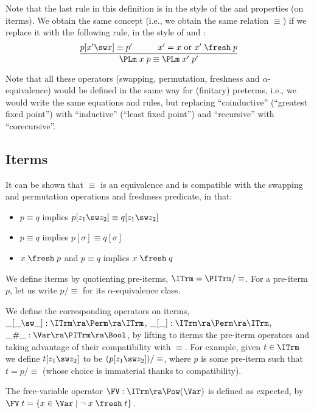Note that the last rule in this definition is in the style of the \SwCg{} and \ISwCg{} properties (on iterms). We obtain the same concept (i.e., we obtain the same relation $\equiv$) if we replace it with the following rule, in the style of \SwBvr{} and \ISwBvr{}: 
%
$$
\frac{
	p[x'\sw x] \equiv p'
	\hspace*{7ex}	
	x' = x \mbox{ or } x' \;\fresh\;p
}
{\PLm\;x\;p \equiv \PLm\;x'\;p'}
$$
%

Note that all these operators (swapping, permutation, freshness and $\alpha$-equivalence) would be defined in the same way for (finitary) preterms, i.e., we would write the same equations and rules, but replacing ``coinductive'' (``greatest fixed point'') with ``inductive'' (``least fixed point'') and ``recursive'' with ``corecursive''.  



\subsection{Iterms}
\label{appsub-iterm}

It can be shown that $\equiv$ is an equivalence and is compatible with the swapping and permutation operations and freshness predicate, in that:
\begin{itemize}
\item $p \equiv q$ implies $p[z_1\sw z_2] \equiv q[z_1\sw z_2] $ 
\item $p \equiv q$ implies $p[\sigma] \equiv q[\sigma] $ 
\item $x \;\fresh\; p$ and $p \equiv q$ implies $x \;\fresh\; q$
\end{itemize}
%

We define iterms by quotienting pre-iterms, $\ITrm = \PITrm/\equiv$. For a pre-iterm $p$, let us write $p/\equiv$ for its $\alpha$-equivalence class. 

We define the corresponding operators on iterms, 
$\_[\_\sw\_] : \ITrm \ra \Perm \ra \ITrm$,  
$\_[\_] : \ITrm \ra \Perm \ra \ITrm$, $\_ \# \_ : \Var \ra \PITrm \ra \Bool$,  
 by lifting to iterms the pre-iterm operators and taking advantage of their compatibility with $\equiv$. For example, 
 given $t\in\ITrm$ we define 
 $t[z_1\sw z_2]$ to be $(p[z_1\sw z_2])/\equiv$, where $p$ is some pre-iterm such that $t = p/\equiv$ (whose choice is immaterial thanks to compatibility).  
 
 The free-variable operator $\FV: \ITrm \ra \Pow(\Var)$ is defined as expected, by $\FV\;t = \{x\in\Var \mid \neg\;x\;\fresh\;t\}$.
 
